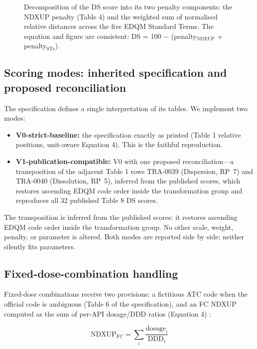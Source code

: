 \documentclass[a4paper]{elsarticle}
\begin{document}
\begin{figure}[htbp]
\centering
\resizebox{\columnwidth}{!}{%
%
}
\caption{Decomposition of the DS score into its two penalty components: the NDXUP penalty (Table 4) and the weighted sum of normalised relative distances across the five EDQM Standard Terms. The equation and figure are consistent: DS = 100 $-$ (penalty$_{\text{NDXUP}}$ + penalty$_{\text{STs}}$).}
\label{fig:ds-formula}
\end{figure}

\subsection{Scoring modes: inherited specification and proposed reconciliation}

The specification defines a single interpretation of its tables. We implement two modes:

\begin{itemize}
\item \textbf{V0-strict-baseline:} the specification exactly as printed (Table 1 relative positions, unit-aware Equation 4). This is the faithful reproduction.
\item \textbf{V1-publication-compatible:} V0 with one proposed reconciliation---a transposition of the adjacent Table 1 rows TRA-0039 (Dispersion, RP~7) and TRA-0040 (Dissolution, RP~5), inferred from the published scores, which restores ascending EDQM code order inside the transformation group and reproduces all 32 published Table 8 DS scores.
\end{itemize}

The transposition is inferred from the published scores: it restores ascending EDQM code order inside the transformation group. No other scale, weight, penalty, or parameter is altered. Both modes are reported side by side; neither silently fits parameters.

\subsection{Fixed-dose-combination handling}

Fixed-dose combinations receive two provisions: a fictitious ATC code when the official code is ambiguous (Table 6 of the specification), and an FC NDXUP computed as the sum of per-API dosage/DDD ratios (Equation 4) \citep{fda2006fixed,ema2010fixed,who2005fixed}:

\begin{equation}
\text{NDXUP}_{\text{FC}} = \sum_i \frac{\text{dosage}_i}{\text{DDD}_i}
\label{eq:fc}
\end{equation}
\end{document}
